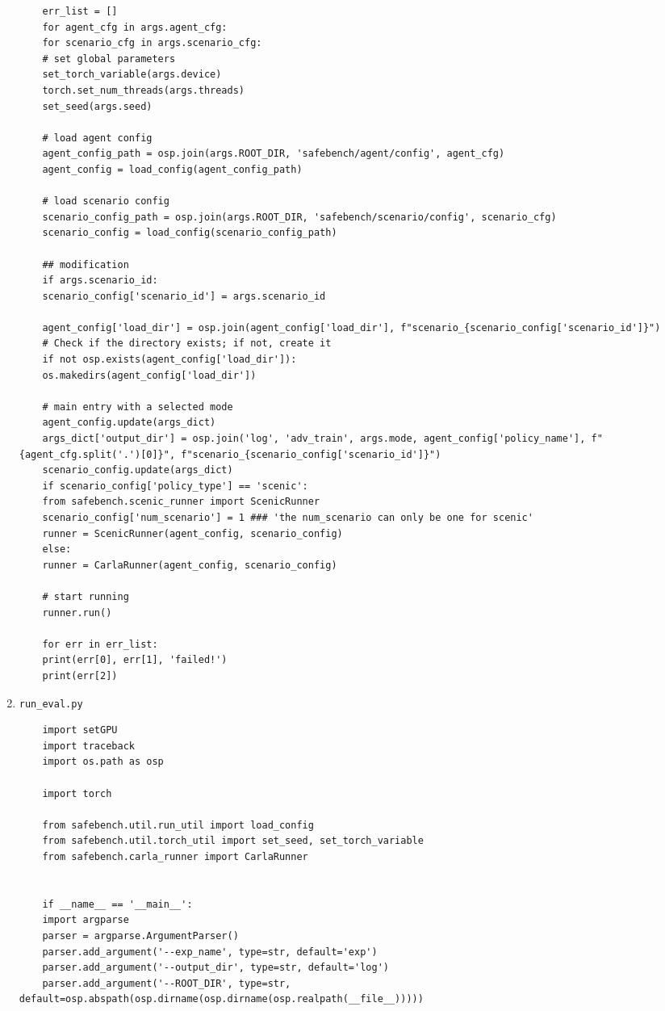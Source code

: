 \begin{enumerate}
\begin{verbatim}
	err_list = []
	for agent_cfg in args.agent_cfg:
	for scenario_cfg in args.scenario_cfg:
	# set global parameters
	set_torch_variable(args.device)
	torch.set_num_threads(args.threads)
	set_seed(args.seed)
	
	# load agent config
	agent_config_path = osp.join(args.ROOT_DIR, 'safebench/agent/config', agent_cfg)
	agent_config = load_config(agent_config_path)
	
	# load scenario config
	scenario_config_path = osp.join(args.ROOT_DIR, 'safebench/scenario/config', scenario_cfg)
	scenario_config = load_config(scenario_config_path)
	
	## modification
	if args.scenario_id:
	scenario_config['scenario_id'] = args.scenario_id
	
	agent_config['load_dir'] = osp.join(agent_config['load_dir'], f"scenario_{scenario_config['scenario_id']}")
	# Check if the directory exists; if not, create it
	if not osp.exists(agent_config['load_dir']):
	os.makedirs(agent_config['load_dir'])        
	
	# main entry with a selected mode
	agent_config.update(args_dict)
	args_dict['output_dir'] = osp.join('log', 'adv_train', args.mode, agent_config['policy_name'], f"{agent_cfg.split('.')[0]}", f"scenario_{scenario_config['scenario_id']}")
	scenario_config.update(args_dict)
	if scenario_config['policy_type'] == 'scenic':
	from safebench.scenic_runner import ScenicRunner
	scenario_config['num_scenario'] = 1 ### 'the num_scenario can only be one for scenic'
	runner = ScenicRunner(agent_config, scenario_config)
	else:
	runner = CarlaRunner(agent_config, scenario_config)
	
	# start running
	runner.run()
	
	for err in err_list:
	print(err[0], err[1], 'failed!')
	print(err[2])
\end{verbatim}
\item \texttt{run\_eval.py}
\begin{verbatim}
	import setGPU
	import traceback
	import os.path as osp
	
	import torch 
	
	from safebench.util.run_util import load_config
	from safebench.util.torch_util import set_seed, set_torch_variable
	from safebench.carla_runner import CarlaRunner
	
	
	if __name__ == '__main__':
	import argparse
	parser = argparse.ArgumentParser()
	parser.add_argument('--exp_name', type=str, default='exp')
	parser.add_argument('--output_dir', type=str, default='log')
	parser.add_argument('--ROOT_DIR', type=str, default=osp.abspath(osp.dirname(osp.dirname(osp.realpath(__file__)))))
	

\end{verbatim}
\end{enumerate}

